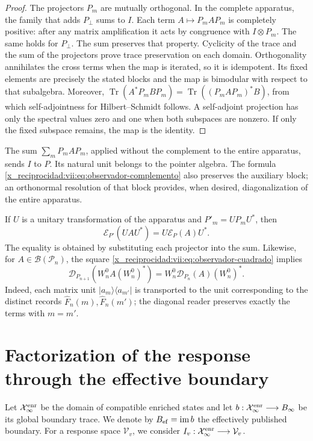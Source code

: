 \begin{proof}
The projectors \(P_m\) are mutually orthogonal. In the complete
apparatus, the family that adds \(P_\perp\) sums to \(I\). Each term
\(A\mapsto P_mAP_m\) is completely positive: after any
matrix amplification it acts by congruence with \(I\otimes P_m\).
The same holds for \(P_\perp\). The sum preserves that property.
Cyclicity of the trace and the sum of the projectors prove
trace preservation on each domain. Orthogonality annihilates the
cross terms when the map is iterated, so it is idempotent.
Its fixed elements are precisely the stated blocks and the
map is bimodular with respect to that subalgebra.
Moreover,
\(\operatorname{Tr}(A^*P_mBP_m)
 =\operatorname{Tr}((P_mAP_m)^*B)\),
from which self-adjointness for Hilbert--Schmidt follows. A self-adjoint
projection has only the spectral values zero and one when
both subspaces are nonzero. If only the fixed subspace remains,
the map is the identity.
\end{proof}

The sum \(\sum_mP_mAP_m\), applied without the complement to the entire
apparatus, sends \(I\) to \(P\). Its natural unit belongs to the pointer
algebra. The formula \eqref{x_reciprocidad:vii:eq:observador-complemento} also preserves
the auxiliary block; an orthonormal resolution of that block
provides, when desired, diagonalization of the entire apparatus.

If \(U\) is a unitary transformation of the apparatus and
\(P'_m=UP_mU^*\), then
\[
 \mathcal E_{P'}(UAU^*)=U\mathcal E_P(A)U^*.
\]
The equality is obtained by substituting each projector into the sum.
Likewise, for \(A\in\mathcal B(\mathcal P_n)\), the square
\eqref{x_reciprocidad:vii:eq:observador-cuadrado} implies
\[
 \mathcal D_{P_{n+1}}(W_n^0A(W_n^0)^*)
 =W_n^0\mathcal D_{P_n}(A)(W_n^0)^*.
\]
Indeed, each matrix unit \(|a_m\rangle\langle a_{m'}|\)
is transported to the unit corresponding to the distinct records
\(\widehat F_n(m),\widehat F_n(m')\); the diagonal reader preserves
exactly the terms with \(m=m'\).

\section{Factorization of the response through the effective boundary}
\label{x_reciprocidad:vii:sec:observador-factorizacion}

Let \(\mathcal X_\infty^{\rm enr}\) be the domain of compatible enriched
states and let
\(b:\mathcal X_\infty^{\rm enr}\longrightarrow B_\infty\) be its global
boundary trace. We denote by \(B_{\rm ef}=\operatorname{im}b\)
the effectively published boundary. For a response space
\(\mathcal V_v\), we consider
\(I_v:\mathcal X_\infty^{\rm enr}\longrightarrow\mathcal V_v\).


